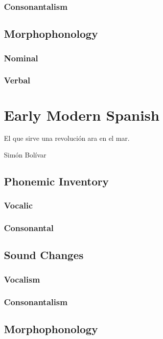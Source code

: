 \documentclass{report}
\begin{document}
\subsection{Consonantalism}

\section{Morphophonology}

\subsection{Nominal}

\subsection{Verbal}

\chapter{Early Modern Spanish}

\epigraph{El que sirve una revolución ara en el mar.}{Simón Bolívar}

\section{Phonemic Inventory}

\subsection{Vocalic}

\subsection{Consonantal}

\section{Sound Changes}

\subsection{Vocalism}

\subsection{Consonantalism}

\section{Morphophonology}
\end{document}
